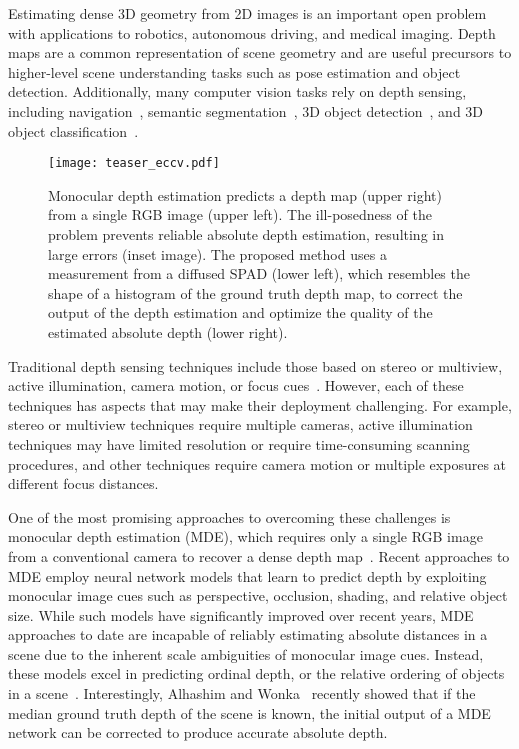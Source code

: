 Estimating dense 3D geometry from 2D images is an important open problem with
applications to robotics, autonomous driving, and medical imaging. Depth maps
are a common representation of scene geometry and are useful precursors to
higher-level scene understanding tasks such as pose estimation and object
detection. Additionally, many computer vision tasks rely on depth sensing,
including navigation~\cite{geiger2013vision}, semantic
segmentation~\cite{gupta2013perceptual,ren2012rgb,silberman2012indoor}, 3D
object
detection~\cite{gupta2014learning,lin2013holistic,shrivastava2013building,song2014sliding,song2016deep},
and 3D object
classification~\cite{maturana2015voxnet,qi2016volumetric,wu20153d}.

\begin{figure}[t]
  \centering
  \texttt{[image: teaser\_eccv.pdf]}
  \caption{Monocular depth estimation predicts a depth map (upper right) from a
    single RGB image (upper left). The ill-posedness of the problem prevents
    reliable absolute depth estimation, resulting in large errors (inset image).
    The proposed method uses a measurement from a diffused SPAD (lower left),
    which resembles the shape of a histogram of the ground truth depth map, to
    correct the output of the depth estimation and optimize the quality of the
    estimated absolute depth (lower right).}
  \label{fig:teaser}
\end{figure}

Traditional depth sensing techniques include those based on stereo or multiview,
active illumination, camera motion, or focus cues~\cite{szeliski2010computer}.
However, each of these techniques has aspects that may make their deployment
challenging. For example, stereo or multiview techniques require multiple
cameras, active illumination techniques may have limited resolution or require
time-consuming scanning procedures, and other techniques require camera motion
or multiple exposures at different focus distances.


One of the most promising approaches to overcoming these challenges is monocular
depth estimation (MDE), which requires only a single RGB image from a
conventional camera to recover a dense depth
map~\cite{Alhashim2018,Eigen2014,Fu2018,Laina2016,Saxena2006}. Recent approaches
to MDE employ neural network models that learn to predict depth by exploiting
monocular image cues such as perspective, occlusion, shading, and relative
object size. While such models have significantly improved over recent years,
MDE approaches to date are incapable of reliably estimating absolute distances
in a scene due to the inherent scale ambiguities of monocular image cues.
Instead, these models excel in predicting ordinal depth, or the relative
ordering of objects in a scene~\cite{Eigen2014,Fu2018}. Interestingly, Alhashim
and Wonka~\cite{Alhashim2018} recently showed that if the median ground truth
depth of the scene is known, the initial output of a MDE network can be
corrected to produce accurate absolute depth.


